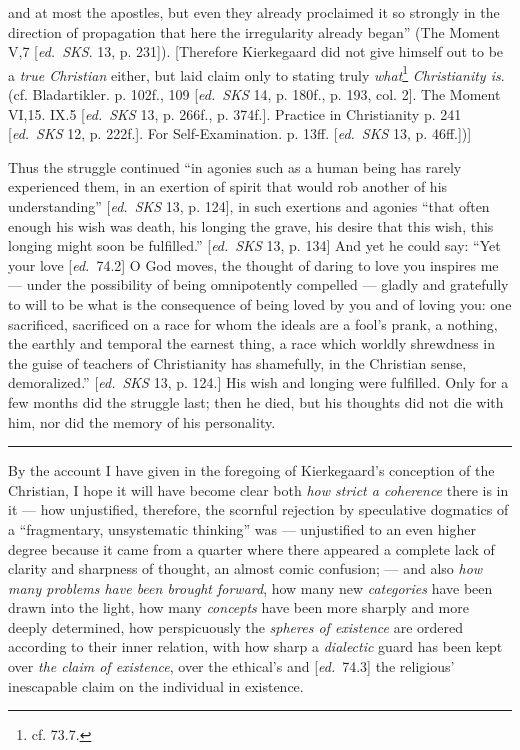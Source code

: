 \documentclass[12pt,a4paper,openany]{book}
\newcommand{\kpage}[1]{\marginnote{\footnotesize\textit{[#1]}}}
\newcommand{\ed}[1]{{\small[\textit{ed.}\ #1]}}
\newcommand{\sepline}{\par\begin{center}\rule{2cm}{0.4pt}\end{center}\par}
\begin{document}
and at most the apostles, but even they already proclaimed it so
strongly in the direction of propagation that here the irregularity already began''
(The Moment V,7 \ed{\emph{SKS}. 13, p. 231}). [Therefore
Kierkegaard did not give himself out to be a \emph{true Christian} either, but laid
claim only to stating truly \emph{what}\footnote[113]{cf. 73.7.} \emph{Christianity is}. (cf. Bladartikler.
p. 102f., 109 \ed{\emph{SKS} 14, p. 180f., p. 193, col. 2}. The Moment
VI,15. IX.5 \ed{\emph{SKS} 13, p. 266f., p. 374f.}. Practice in Christianity p.
241 \ed{\emph{SKS} 12, p. 222f.}. For Self-Examination. p. 13ff. \ed{\emph{SKS} 13, p. 46ff.})]

Thus the struggle continued ``in agonies such as a human being has
rarely experienced them, in an exertion of spirit that would rob another of his understanding''
\ed{\emph{SKS} 13, p. 124}, in such exertions and agonies ``that
often enough his wish was death, his longing the grave, his desire
that this wish, this longing might soon be fulfilled.'' \ed{\emph{SKS}
13, p. 134} And yet he could say: ``Yet your love \ed{74.2} O
God moves, the thought of daring to love you inspires me --- under
the possibility of being omnipotently compelled --- gladly and gratefully to
\kpage{163}will to be what is the consequence of being loved by you and of loving
you: one sacrificed, sacrificed on a race for whom the ideals are a fool's prank,
a nothing, the earthly and temporal the earnest thing, a race which
worldly shrewdness in the guise of teachers of Christianity has shamefully,
in the Christian sense, demoralized.'' \ed{\emph{SKS} 13, p. 124.} His wish
and longing were fulfilled. Only for a few months did the struggle last;
then he died, but his thoughts did not die with him, nor did the memory
of his personality.

\sepline

By the account I have given in the foregoing of Kierkegaard's
conception of the Christian, I hope it will have become clear
both \emph{how strict a coherence} there is in it --- how unjustified, therefore,
the scornful rejection by speculative dogmatics of a ``fragmentary,
unsystematic thinking'' was --- unjustified to an even higher
degree because it came from a quarter where there appeared a complete
lack of clarity and sharpness of thought, an almost comic confusion;
--- and also \emph{how many problems have been brought forward}, how many
new \emph{categories} have been drawn into the light, how many \emph{concepts}
have been more sharply and more deeply determined, how perspicuously the \emph{spheres of existence}
are ordered according to their inner relation, with how sharp a \emph{dialectic}
guard has been kept over \emph{the claim of existence}, over the ethical's and \ed{74.3} the religious'
inescapable claim on the individual in existence.
\end{document}

